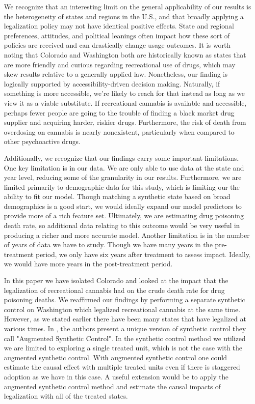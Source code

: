 \documentclass{article}
\begin{document}
We recognize that an interesting limit on the general applicability of our results is the heterogeneity of states and regions in the U.S., and that broadly applying a legalization policy may not have identical positive effects. State and regional preferences, attitudes, and political leanings often impact how these sort of policies are received and can drastically change usage outcomes. It is worth noting that Colorado and Washington both are historically known as states that are more friendly and curious regarding recreational use of drugs, which may skew results relative to a generally applied law. Nonetheless, our finding is logically supported by accessibility-driven decision making. Naturally, if something is more accessible, we're likely to reach for that instead as long as we view it as a viable substitute. If recreational cannabis is available and accessible, perhaps fewer people are going to the trouble of finding a black market drug supplier and acquiring harder, riskier drugs. Furthermore, the risk of death from overdosing on cannabis is nearly nonexistent, particularly when compared to other psychoactive drugs.

Additionally, we recognize that our findings carry some important limitations. One key limitation is in our data. We are only able to use data at the state and year level, reducing some of the granularity in our results. Furthermore, we are limited primarily to demographic data for this study, which  is limiting our the ability to fit our model. Though matching a synthetic state based on broad demographics is a good start, we would ideally expand our model predictors to provide more of a rich feature set. Ultimately, we are estimating drug poisoning death rate, so additional data relating to this outcome would be very useful in producing a richer and more accurate model. Another limitation is in the number of years of data we have to study. Though we have many years in the pre-treatment period, we only have six years after treatment to assess impact. Ideally, we would have more years in the post-treatment period.

In this paper we have isolated Colorado and looked at the impact that the legalization of recreational cannabis had on the crude death rate for drug poisoning deaths. We reaffirmed our findings by performing a separate synthetic control on Washington which legalized recreational cannabis at the same time. However, as we stated earlier there have been many states that have legalized at various times. In \citet{aug-synth}, the authors present a unique version of synthetic control they call "Augmented Synthetic Control". In the synthetic control method we utilized we are limited to exploring a single treated unit, which is not the case with the augmented synthetic control. With augmented synthetic control one could estimate the causal effect with multiple treated units even if there is staggered adoption as we have in this case. A useful extension would be to apply the augmented synthetic control method and estimate the causal impacts of legalization with all of the treated states.
\end{document}
